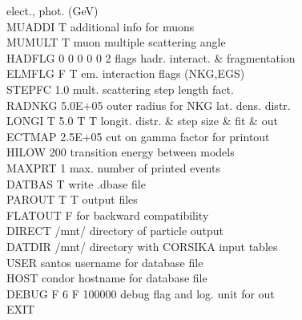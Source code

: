 \null\hfill elect., phot. (GeV) \\
MUADDI  T            \hfill                         additional info for muons \\
MUMULT  T             \hfill                        muon multiple scattering angle \\
HADFLG  0 0 0 0 0 2    \hfill                       flags hadr. interact. \& fragmentation \\
ELMFLG  F T          \hfill                         em. interaction flags (NKG,EGS) \\
STEPFC  1.0        \hfill                           mult. scattering step length fact. \\
RADNKG  5.0E+05     \hfill                          outer radius for NKG lat. dens. distr. \\
LONGI   T 5.0 T T     \hfill         longit. distr. \& step size \& fit \& out  \\
ECTMAP  2.5E+05      \hfill                         cut on gamma factor for printout \\
HILOW   200         \hfill                          transition energy between models \\
MAXPRT  1           \hfill                          max. number of printed events \\
DATBAS  T           \hfill                          write .dbase file \\
PAROUT  T T           \hfill                        output files \\
FLATOUT F              \hfill                       for backward compatibility \\
DIRECT  /mnt/   \hfill     directory of particle output \\
DATDIR  /mnt/  \hfill directory with CORSIKA input tables \\
USER    santos         \hfill                       username for database file \\
HOST    condor         \hfill                       hostname for database file   \\
DEBUG   F 6 F 100000     \hfill                     debug flag and log. unit for out \\
EXIT
\endgroup

